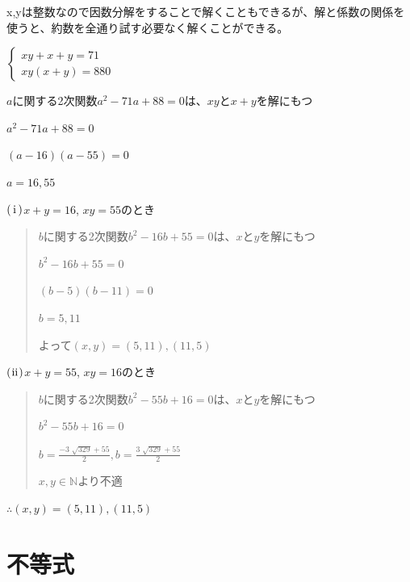 \documentclass[uplatex,fleqn]{jsbook}
\begin{document}
\begin{answer}
    x,yは整数なので因数分解をすることで解くこともできるが、解と係数の関係を使うと、約数を全通り試す必要なく解くことができる。

    \begin{math}
        \begin{cases}
            xy+x+y=71\\
            xy\left(x+y\right)=880
        \end{cases}
    \end{math}

    $a$に関する2次関数$a^2-71a+88=0$は、$xy$と$x+y$を解にもつ

    $a^2-71a+88=0$

    $\left(a-16\right)\left(a-55\right)=0$

    $a=16,55$

    $\rm\left(\hspace{.18em}i\hspace{.18em}\right)$$x+y=16$, $xy=55$のとき

    \begin{quote}
        $b$に関する2次関数$b^2-16b+55=0$は、$x$と$y$を解にもつ

        $b^2-16b+55=0$

        $\left(b-5\right)\left(b-11\right)=0$

        $b=5,11$

        よって$\left(x,y\right)=\left(5,11\right),\left(11,5\right)$
    \end{quote}

    $\rm\left(\hspace{.08em}ii\hspace{.08em}\right)$$x+y=55$, $xy=16$のとき
    \begin{quote}
        $b$に関する2次関数$b^2-55b+16=0$は、$x$と$y$を解にもつ

        $b^2-55b+16=0$

        $\displaystyle b=\frac{-3 \; \sqrt{329} + 55}{2}, b=\frac{3 \; \sqrt{329} + 55}{2}$

        $x,y\in\mathbb{N}$より不適
    \end{quote}

    $\therefore \left(x,y\right)=\left(5,11\right),\left(11,5\right)$
\end{answer}

\section{不等式}
\end{document}
